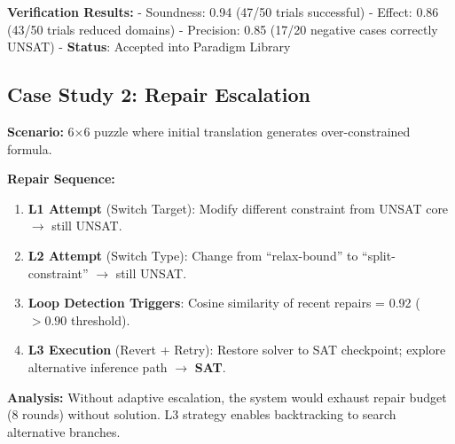 \textbf{Verification Results:}
- Soundness: 0.94 (47/50 trials successful)
- Effect: 0.86 (43/50 trials reduced domains)
- Precision: 0.85 (17/20 negative cases correctly UNSAT)
- \textbf{Status}: Accepted into Paradigm Library

\subsection{Case Study 2: Repair Escalation}

\textbf{Scenario:} 6$\times$6 puzzle where initial translation generates over-constrained formula.

\textbf{Repair Sequence:}
\begin{enumerate}
    \item \textbf{L1 Attempt} (Switch Target): Modify different constraint from UNSAT core $\to$ still UNSAT.
    \item \textbf{L2 Attempt} (Switch Type): Change from ``relax-bound'' to ``split-constraint'' $\to$ still UNSAT.
    \item \textbf{Loop Detection Triggers}: Cosine similarity of recent repairs = 0.92 ($> 0.90$ threshold).
    \item \textbf{L3 Execution} (Revert + Retry): Restore solver to SAT checkpoint; explore alternative inference path $\to$ \textbf{SAT}.
\end{enumerate}

\textbf{Analysis:} Without adaptive escalation, the system would exhaust repair budget (8 rounds) without solution. L3 strategy enables backtracking to search alternative branches.

